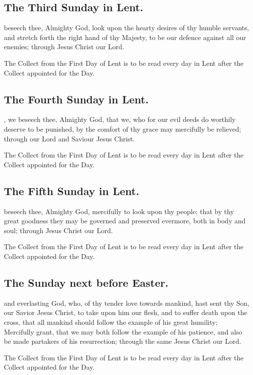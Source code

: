 \subsection{The Third Sunday in Lent.}
 beseech thee, Almighty God, look upon the hearty desires of thy humble servants, and stretch forth the right hand of thy Majesty, to be our defence against all our enemies; through Jesus Christ our Lord.
\begin{secrubric}
The Collect from the First Day of Lent is to be read every day in Lent after the Collect appointed for the Day.
\end{secrubric}

\subsection{The Fourth Sunday in Lent.}
, we beseech thee, Almighty God, that we, who for our evil deeds do worthily deserve to be punished, by the comfort of thy grace may mercifully be relieved; through our Lord and Saviour Jesus Christ.
\begin{secrubric}
The Collect from the First Day of Lent is to be read every day in Lent after the Collect appointed for the Day.
\end{secrubric}

\subsection{The Fifth Sunday in Lent.}
 beseech thee, Almighty God, mercifully to look upon thy people; that by thy great goodness they may be governed and preserved evermore, both in body and soul; through Jesus Christ our Lord.
\begin{secrubric}
The Collect from the First Day of Lent is to be read every day in Lent after the Collect appointed for the Day.
\end{secrubric}

\subsection{The Sunday next before Easter.}
 and everlasting God, who, of thy tender love towards mankind, hast sent thy Son, our Savior Jesus Christ, to take upon him our flesh, and to suffer death upon the cross, that all mankind should follow the example of his great humility; Mercifully grant, that we may both follow the example of his patience, and also be made partakers of his resurrection; through the same Jesus Christ our Lord.
\begin{secrubric}
The Collect from the First Day of Lent is to be read every day in Lent after the Collect appointed for the Day.
\end{secrubric}

